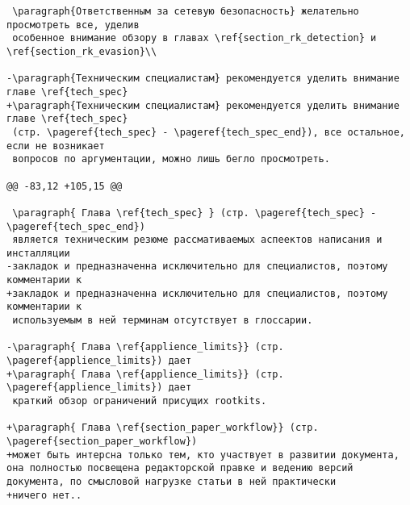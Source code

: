 \begin{verbatim}
 \paragraph{Ответственным за сетевую безопасность} желательно просмотреть все, уделив
 особенное внимание обзору в главах \ref{section_rk_detection} и \ref{section_rk_evasion}\\

-\paragraph{Техническим специалистам} рекомендуется уделить внимание главе \ref{tech_spec}
+\paragraph{Техническим специалистам} рекомендуется уделить внимание главе \ref{tech_spec}
 (стр. \pageref{tech_spec} - \pageref{tech_spec_end}), все остальное, если не возникает
 вопросов по аргументации, можно лишь бегло просмотреть.

@@ -83,12 +105,15 @@

 \paragraph{ Глава \ref{tech_spec} } (стр. \pageref{tech_spec} - \pageref{tech_spec_end})
 является техническим резюме рассмативаемых аспеектов написания и инсталляции
-закладок и предназначенна исключительно для специалистов, поэтому комментарии к
+закладок и предназначенна исключительно для специалистов, поэтому комментарии к
 используемым в ней терминам отсутствует в глоссарии.

-\paragraph{ Глава \ref{applience_limits}} (стр. \pageref{applience_limits}) дает
+\paragraph{ Глава \ref{applience_limits}} (стр. \pageref{applience_limits}) дает
 краткий обзор ограничений присущих rootkits.

+\paragraph{ Глава \ref{section_paper_workflow}} (стр. \pageref{section_paper_workflow})
+может быть интерсна только тем, кто участвует в развитии документа, она полностью посвещена редакторской правке и ведению версий документа, по смысловой нагрузке статьи в ней практически
+ничего нет..


\end{verbatim}
